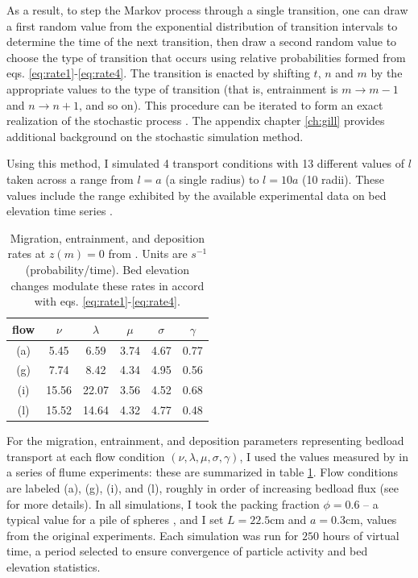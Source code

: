 As a result, to step the Markov process through a single transition, one can draw a first random value from the exponential distribution of transition intervals to determine the time of the next transition,
then draw a second random value to choose the type of transition that occurs using relative probabilities formed from eqs. \ref{eq:rate1}-\ref{eq:rate4}. The transition is enacted by shifting $t$, $n$ and $m$ by the appropriate values to the type of transition (that is, entrainment is $m\rightarrow m-1$ and $n \rightarrow n+1$, and so on).
This procedure can be iterated to form an exact realization of the stochastic process \citep{Gillespie2007}.
The appendix chapter \ref{ch:gill} provides additional background on the stochastic simulation method.

Using this method, I simulated 4 transport conditions with 13 different values of $l$ taken across a range from $l=a$ (a single radius) to $l=10a$ (10 radii).
These values include the range exhibited by the available experimental data on bed elevation time series \citep{Wong2007,Singh2009,Martin2014}.

\begin{table}
	\caption{Migration, entrainment, and deposition rates at $z(m)=0$ from \citet{Ancey2008}. Units are $s^{-1}$ (probability/time). Bed elevation changes modulate these rates in accord with eqs. \ref{eq:rate1}-\ref{eq:rate4}.}\label{tab:anceyparams}
	\begin{tabular}{cccccc} \\ 
		\toprule  
		flow & $\nu$ & $\lambda$ & $\mu$ & $\sigma$ & $\gamma$ \\
		\midrule
		(a) & 5.45  & 6.59  & 3.74 & 4.67 & 0.77 \\
		\midrule
		(g) & 7.74  & 8.42  & 4.34 & 4.95 & 0.56 \\
		\midrule
		(i) & 15.56 & 22.07 & 3.56 & 4.52 & 0.68 \\
		\midrule
		(l) & 15.52 & 14.64 & 4.32 & 4.77 & 0.48 \\
		\bottomrule
	\end{tabular}
\end{table}
For the migration, entrainment, and deposition parameters representing bedload transport at each flow condition $(\nu, \lambda, \mu, \sigma, \gamma)$, I used the values measured by \citet{Ancey2008} in a series of flume experiments: these are summarized in table \ref{tab:anceyparams}.
Flow conditions are labeled (a), (g), (i), and (l), roughly in order of increasing bedload flux (see \citet{Ancey2008} for more details). 
In all simulations, I took the packing fraction $\phi = 0.6$ -- a typical value for a pile of spheres \citep[e.g.,][]{Bennett1972}, and I set $L = 22.5$cm and $a = 0.3$cm, values from the original \citet{Ancey2008} experiments.
Each simulation was run for $250$ hours of virtual time, a period selected to ensure convergence of particle activity and bed elevation statistics.

